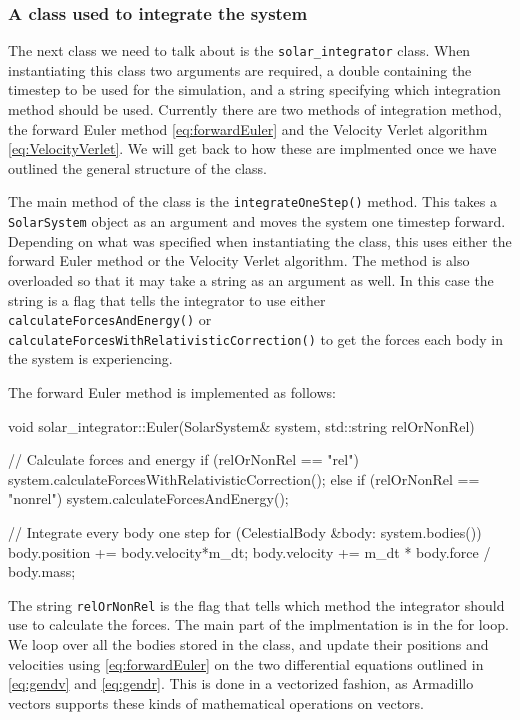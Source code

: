 \documentclass[reprint,english,notitlepage]{revtex4-1}  %
\begin{document}
\subsubsection{A class used to integrate the system} \label{sec:III:a:3}

The next class we need to talk about is the \verb+solar_integrator+ class. When instantiating this class two arguments are required, a double containing the timestep to be used for the simulation, and a string specifying which integration method should be used. Currently there are two methods of integration method, the forward Euler method \eqref{eq:forwardEuler} and the Velocity Verlet algorithm \eqref{eq:VelocityVerlet}. We will get back to how these are implmented once we have outlined the general structure of the class. 

The main method of the class is the \verb+integrateOneStep()+ method. This takes a \verb+SolarSystem+ object as an argument and moves the system one timestep forward. Depending on what was specified when instantiating the class, this uses either the forward Euler method or the Velocity Verlet algorithm. The method is also overloaded so that it may take a string as an argument as well. In this case the string is a flag that tells the integrator to use either \verb+calculateForcesAndEnergy()+ or \verb+calculateForcesWithRelativisticCorrection()+ to get the forces each body in the system is experiencing. 

The forward Euler method is implemented as follows:
\begin{cpp}
void solar_integrator::Euler(SolarSystem& system, 
							 std::string relOrNonRel) {
  // Calculate forces and energy
  if (relOrNonRel == "rel") {
    system.calculateForcesWithRelativisticCorrection();
  } else if (relOrNonRel == "nonrel") {
    system.calculateForcesAndEnergy();
  }

  // Integrate every body one step
  for (CelestialBody &body: system.bodies()) {
    body.position += body.velocity*m_dt;
    body.velocity += m_dt * body.force / body.mass;
  }
}
\end{cpp} 

The string \verb+relOrNonRel+ is the flag that tells which method the integrator should use to calculate the forces.    The main part of the implmentation is in the for loop. We loop over all the bodies stored in the class, and update their positions and velocities using \eqref{eq:forwardEuler} on the two differential equations outlined in \eqref{eq:gendv} and \eqref{eq:gendr}. This is done in a vectorized fashion, as Armadillo \citep{Armadillo} vectors supports these kinds of mathematical operations on vectors.
\end{document}
